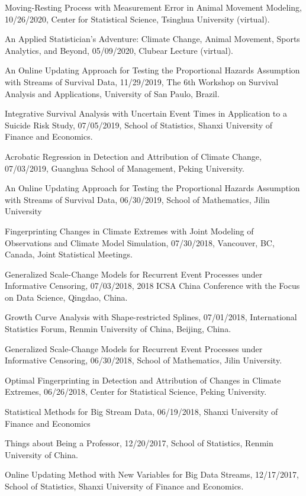 \documentclass[Statistics]{vita}
\begin{document}
\begin{vita}
\begin{InvitedTalks}
  \item Moving-Resting Process with Measurement Error in Animal Movement Modeling, 10/26/2020, Center for Statistical Science, Tsinghua University (virtual).
  \item An Applied Statistician's Adventure: Climate Change, Animal Movement, Sports Analytics, and Beyond, 05/09/2020, Clubear Lecture (virtual).
  \item An Online Updating Approach for Testing the Proportional Hazards Assumption with Streams of Survival Data, 11/29/2019, The 6th Workshop on Survival Analysis and Applications, University of San Paulo, Brazil.
  \item Integrative Survival Analysis with Uncertain Event Times in Application to a Suicide Risk Study, 07/05/2019, School of Statistics, Shanxi University of Finance and Economics.
  \item Acrobatic Regression in Detection and Attribution of Climate Change, 07/03/2019, Guanghua School of Management, Peking University.
  \item An Online Updating Approach for Testing the Proportional Hazards Assumption with Streams of Survival Data, 06/30/2019, School of Mathematics, Jilin University
  \item Fingerprinting Changes in Climate Extremes with Joint Modeling of Observations and Climate Model Simulation, 07/30/2018, Vancouver, BC, Canada, Joint Statistical Meetings.
  \item Generalized Scale-Change Models for Recurrent Event Processes under Informative Censoring, 07/03/2018, 2018 ICSA China Conference with the Focus on Data Science, Qingdao, China.
  \item Growth Curve Analysis with Shape-restricted Splines, 07/01/2018, International Statistics Forum, Renmin University of China, Beijing, China.
  \item Generalized Scale-Change Models for Recurrent Event Processes under Informative Censoring, 06/30/2018, School of Mathematics, Jilin University.
  \item Optimal Fingerprinting in Detection and Attribution of Changes in Climate Extremes, 06/26/2018, Center for Statistical Science, Peking University.
  \item Statistical Methods for Big Stream Data, 06/19/2018, Shanxi University of Finance and Economics
  \item Things about Being a Professor, 12/20/2017, School of Statistics, Renmin University of China.
  \item Online Updating Method with New Variables for Big Data Streams, 12/17/2017, School of Statistics, Shanxi University of Finance and Economics.

\end{InvitedTalks}
\end{vita}
\end{document}
